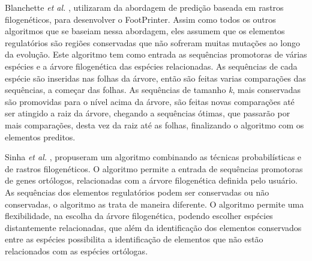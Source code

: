 Blanchette \textit{et al.} \cite{Blanchette2002}, utilizaram da abordagem de predição baseada em rastros filogenéticos, para desenvolver o FootPrinter. Assim como todos os outros algoritmos que se baseiam nessa abordagem, eles assumem que os elementos regulatórios são regiões conservadas que não sofreram muitas mutações ao longo da evolução. Este algoritmo tem como entrada as sequências promotoras de várias espécies e a árvore filogenética das espécies relacionadas. As sequências de cada espécie são inseridas nas folhas da árvore, então são feitas varias comparações das sequências, a começar das folhas. As sequências de tamanho \textit{k}, mais conservadas são promovidas para o nível acima da árvore, são feitas novas comparações até ser atingido a raiz da árvore, chegando a sequências ótimas, que passarão por mais comparações, desta vez da raiz até as folhas, finalizando o algoritmo com os elementos preditos.

Sinha \textit{et al.} \cite{Sinha2004}, propuseram um algoritmo combinando as técnicas probabilísticas e de rastros filogenéticos. O algoritmo permite a entrada de sequências promotoras de genes ortólogos, relacionadas com a árvore filogenética definida pelo usuário. As sequências dos elementos regulatórios podem ser conservadas ou não conservadas, o algoritmo as trata de maneira diferente. O algoritmo permite uma flexibilidade, na escolha da árvore filogenética, podendo escolher espécies distantemente relacionadas, que além da identificação dos elementos conservados entre as espécies possibilita a identificação de elementos que não estão relacionados com as espécies ortólogas.
